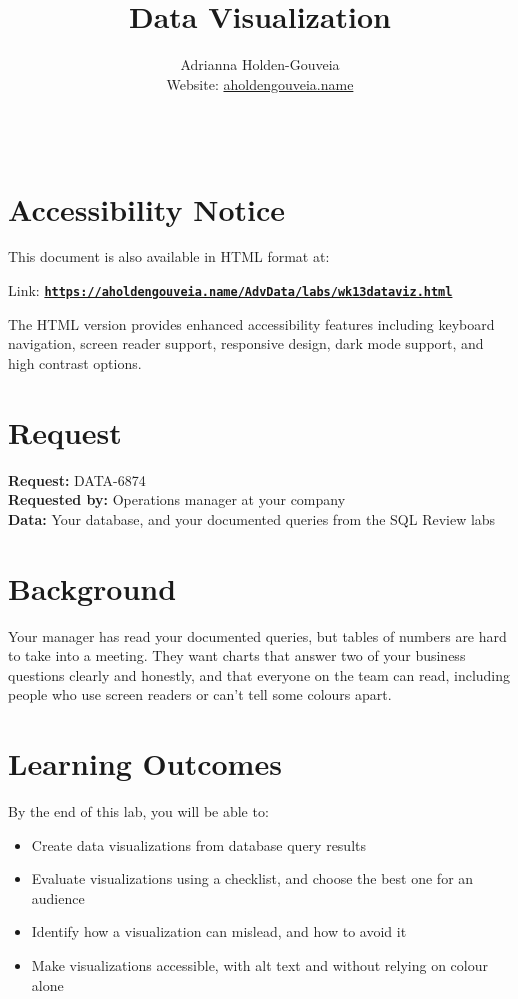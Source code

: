 \documentclass[12pt]{article}
\title{Data Visualization}
\author{
        Adrianna Holden-Gouveia \\
        Website: \href{https://aholdengouveia.name}{aholdengouveia.name}\\ 
        \date{\vspace{-5ex}}
        \faGithub {: aholdengouveia} \\
        }
\begin{document}
    

\maketitle



\section*{Accessibility Notice}
This document is also available in HTML format at:

Link: \href{https://aholdengouveia.name/AdvData/labs/wk13dataviz.html}{\textbf{\nolinkurl{https://aholdengouveia.name/AdvData/labs/wk13dataviz.html}}}

The HTML version provides enhanced accessibility features including keyboard navigation, screen reader support, responsive design, dark mode support, and high contrast options.

\section*{Request}
\noindent\textbf{Request:} DATA-6874\\
\textbf{Requested by:} Operations manager at your company\\
\textbf{Data:} Your database, and your documented queries from the SQL Review labs

\section*{Background}
Your manager has read your documented queries, but tables of numbers are hard to take into a meeting. They want charts that answer two of your business questions clearly and honestly, and that everyone on the team can read, including people who use screen readers or can't tell some colours apart.

\section*{Learning Outcomes}
By the end of this lab, you will be able to:
\begin{itemize}
    \item Create data visualizations from database query results
    \item Evaluate visualizations using a checklist, and choose the best one for an audience
    \item Identify how a visualization can mislead, and how to avoid it
    \item Make visualizations accessible, with alt text and without relying on colour alone
\end{itemize}
\end{document}
